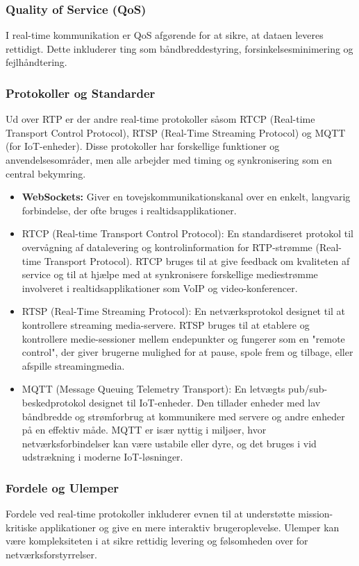\subsubsection{Quality of Service (QoS)}
I real-time kommunikation er QoS afgørende for at sikre, at dataen leveres rettidigt. Dette inkluderer ting som båndbreddestyring, forsinkelsesminimering og fejlhåndtering.
\subsubsection{Protokoller og Standarder}
Ud over RTP er der andre real-time protokoller såsom RTCP (Real-time Transport Control Protocol), RTSP (Real-Time Streaming Protocol) og MQTT (for IoT-enheder). Disse protokoller har forskellige funktioner og anvendelsesområder, men alle arbejder med timing og synkronisering som en central bekymring.
\begin{itemize}
	\item \textbf{WebSockets:} Giver en tovejskommunikationskanal over en enkelt, langvarig forbindelse, der ofte bruges i realtidsapplikationer.
	\item  RTCP (Real-time Transport Control Protocol): En standardiseret protokol til overvågning af datalevering og kontrolinformation for RTP-strømme (Real-time Transport Protocol). RTCP bruges til at give feedback om kvaliteten af service og til at hjælpe med at synkronisere forskellige mediestrømme involveret i realtidsapplikationer som VoIP og video-konferencer.
	
	\item RTSP (Real-Time Streaming Protocol): En netværksprotokol designet til at kontrollere streaming media-servere. RTSP bruges til at etablere og kontrollere medie-sessioner mellem endepunkter og fungerer som en "remote control", der giver brugerne mulighed for at pause, spole frem og tilbage, eller afspille streamingmedia.
	
	\item MQTT (Message Queuing Telemetry Transport): En letvægts pub/sub-beskedprotokol designet til IoT-enheder. Den tillader enheder med lav båndbredde og strømforbrug at kommunikere med servere og andre enheder på en effektiv måde. MQTT er især nyttig i miljøer, hvor netværksforbindelser kan være ustabile eller dyre, og det bruges i vid udstrækning i moderne IoT-løsninger.
\end{itemize}
\subsubsection{Fordele og Ulemper}
Fordele ved real-time protokoller inkluderer evnen til at understøtte mission-kritiske applikationer og give en mere interaktiv brugeroplevelse. Ulemper kan være kompleksiteten i at sikre rettidig levering og følsomheden over for netværksforstyrrelser.
